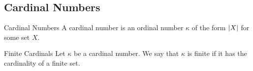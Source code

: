 \documentclass[a4paper]{article}
\begin{document}
\subsection{Cardinal Numbers}
\begin{defn}{Cardinal Numbers}{} A cardinal number is an ordinal number $\kappa$ of the form $\abs{X}$ for some set $X$. 
\end{defn}

\begin{defn}{Finite Cardinals}{} Let $\kappa$ be a cardinal number. We say that $\kappa$ is finite if it has the cardinality of a finite set. 
\end{defn}
 
\end{document}
